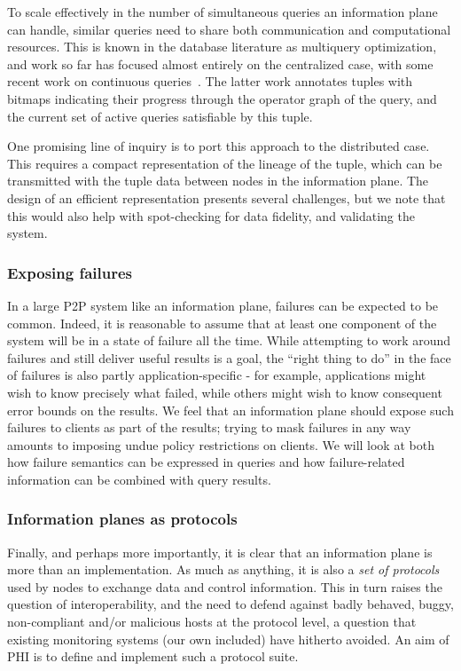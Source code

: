 \documentclass[10pt,twocolumn]{MyTightStyle}
\def\IP{information plane\xspace}
\def\PHI{PHI\xspace}
\begin{document}
To scale effectively in the number of simultaneous queries an \IP can
handle, similar queries need to share both communication and
computational resources.   This is known in the database literature as
multiquery optimization, and work so far has focused almost entirely
on the centralized case, with some recent work on
continuous queries~\cite{madden_cacq}.  The latter work annotates
tuples with bitmaps indicating their progress through the operator
graph of the query, and the current set of active queries 
satisfiable by this tuple.  

One promising line of inquiry is to port this approach to the
distributed case.  This requires a compact representation of the
lineage of the tuple, which can be transmitted with the tuple data
between nodes in the \IP.  The design of an efficient
representation presents several challenges, but we note that this
would also help with spot-checking for data fidelity, and validating
the system. 

\subsubsection*{Exposing failures}

In a large P2P system like an \IP, failures can be expected to be
common. Indeed, it is reasonable to assume that at least one component
of the system will be in a state of failure all the time.  While 
attempting to work around failures and still deliver useful results is
a goal, the ``right thing to do'' in the face of failures is also
partly application-specific - for example, applications might wish
to know precisely what failed, while others might wish to know consequent
error bounds on the results.  We feel that an \IP should expose 
such failures to clients as part of the results; trying to mask
failures in any way amounts to imposing undue policy restrictions on
clients.   We will look at both how failure semantics can be
expressed in queries and how failure-related information can be
combined with query results. 

\subsubsection*{Information planes as protocols}

Finally, and perhaps more importantly, it is clear that an \IP is more
than an implementation.  As much as 
anything, it is also a \emph{set of protocols} used by nodes to exchange
data and control information.  This in turn raises the question of
interoperability, and the need to defend against badly behaved, buggy,
non-compliant and/or malicious hosts at the protocol level, a question
that existing monitoring systems (our own included) have hitherto
avoided.  An aim of \PHI is to define and implement such a
protocol suite. 
\end{document}
